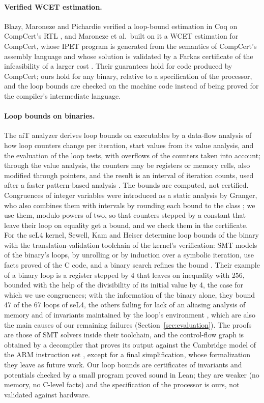 \documentclass[oneside,english]{amsart}
\numberwithin{equation}{section}
\theoremstyle{plain}
\theoremstyle{definition}
\theoremstyle{plain}
\theoremstyle{plain}
\theoremstyle{remark}
\begin{document}
\paragraph{Verified WCET estimation.} Blazy, Maroneze and Pichardie verified a loop-bound estimation in Coq on CompCert's RTL \cite{blazy2013formal}, and Maroneze et al.\ built on it a WCET estimation for CompCert, whose IPET program is generated from the semantics of CompCert's assembly language and whose solution is validated by a Farkas certificate of the infeasibility of a larger cost \cite{maroneze2014formally}. Their guarantees hold for code produced by CompCert; ours hold for any binary, relative to a specification of the processor, and the loop bounds are checked on the machine code instead of being proved for the compiler's intermediate language.

\paragraph{Loop bounds on binaries.} The aiT analyzer derives loop bounds on executables by a data-flow analysis of how loop counters change per iteration, start values from its value analysis, and the evaluation of the loop tests, with overflows of the counters taken into account; through the value analysis, the counters may be registers or memory cells, also modified through pointers, and the result is an interval of iteration counts, used after a faster pattern-based analysis \cite{cullmann2007data}. The bounds are computed, not certified. Congruences of integer variables were introduced as a static analysis by Granger, who also combines them with intervals by rounding each bound to the class \cite{granger1989static}; we use them, modulo powers of two, so that counters stepped by a constant that leave their loop on equality get a bound, and we check them in the certificate. For the seL4 kernel, Sewell, Kam and Heiser determine loop bounds of the binary with the translation-validation toolchain of the kernel's verification: SMT models of the binary's loops, by unrolling or by induction over a symbolic iteration, use facts proved of the C code, and a binary search refines the bound \cite{sewell2016complete,sewell2017high}. Their example of a binary loop is a register stepped by 4 that leaves on inequality with 256, bounded with the help of the divisibility of its initial value by 4, the case for which we use congruences; with the information of the binary alone, they bound 47 of the 67 loops of seL4, the others failing for lack of an aliasing analysis of memory and of invariants maintained by the loop's environment \cite{sewell2016complete}, which are also the main causes of our remaining failures (Section~\ref{sec:evaluation}). The proofs are those of SMT solvers inside their toolchain, and the control-flow graph is obtained by a decompiler that proves its output against the Cambridge model of the ARM instruction set \cite{fox2010trustworthy}, except for a final simplification, whose formalization they leave as future work. Our loop bounds are certificates of invariants and potentials checked by a small program proved sound in Lean; they are weaker (no memory, no C-level facts) and the specification of the processor is ours, not validated against hardware.
\end{document}
